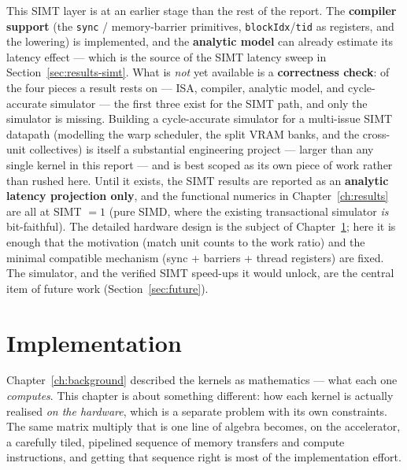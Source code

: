 \documentclass[11pt]{report}
\begin{document}
This SIMT layer is at an earlier stage than the rest of the report. The
\textbf{compiler support} (the \texttt{sync} / memory-barrier primitives,
\texttt{blockIdx}/\texttt{tid} as registers, and the lowering) is implemented,
and the \textbf{analytic model} can already estimate its latency effect ---
which is the source of the SIMT latency sweep in
Section~\ref{sec:results-simt}. What is \emph{not} yet available is a
\textbf{correctness check}: of the four pieces a result rests on --- ISA,
compiler, analytic model, and cycle-accurate simulator --- the first three
exist for the SIMT path, and only the simulator is missing. Building a
cycle-accurate simulator for a multi-issue SIMT datapath (modelling the warp
scheduler, the split VRAM banks, and the cross-unit collectives) is itself a
substantial engineering project --- larger than any single kernel in this
report --- and is best scoped as its own piece of work rather than rushed
here. Until it exists, the SIMT results are reported as an \textbf{analytic
latency projection only}, and the functional numerics in
Chapter~\ref{ch:results} are all at SIMT $=1$ (pure SIMD, where the existing
transactional simulator \emph{is} bit-faithful). The detailed hardware design
is the subject of Chapter~\ref{ch:implementation}; here it is enough that the
motivation (match unit counts to the work ratio) and the minimal compatible
mechanism (sync + barriers + thread registers) are fixed. The simulator, and
the verified SIMT speed-ups it would unlock, are the central item of future
work (Section~\ref{sec:future}).


\chapter{Implementation}
\label{ch:implementation}

Chapter~\ref{ch:background} described the kernels as mathematics --- what
each one \emph{computes}. This chapter is about something different: how
each kernel is actually realised \emph{on the hardware}, which is a separate
problem with its own constraints. The same matrix multiply that is one line
of algebra becomes, on the accelerator, a carefully tiled, pipelined
sequence of memory transfers and compute instructions, and getting that
sequence right is most of the implementation effort.
\end{document}
